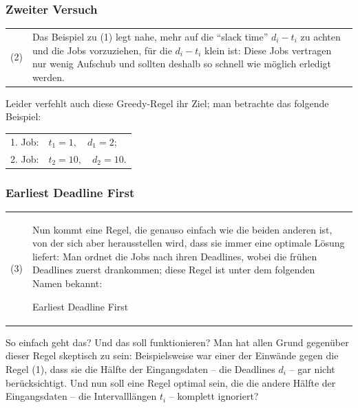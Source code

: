 \documentclass[smaller]{beamer}
\begin{document}
\begin{frame}
\frametitle{Zweiter Versuch}
\begin{tabular}{p{0.5cm}p{10cm}} 
(2) & Das Beispiel zu (1) legt nahe, mehr auf die \enquote{slack time} $d_i - t_i$ zu achten und \alert{die Jobs vorzuziehen, für die $d_i-t_i$ klein ist:} Diese Jobs vertragen nur wenig Aufschub und sollten deshalb so schnell wie möglich erledigt werden.
\end{tabular}
\medskip

Leider verfehlt auch diese Greedy-Regel ihr Ziel; man betrachte das folgende Beispiel:

\begin{center}
\begin{tabular}{rl}
1. Job: & $t_1=1, \quad d_1=2$; \\
2. Job: & $t_2=10, \quad d_2=10$.
\end{tabular}
\end{center}
\end{frame}

\begin{frame}
 \frametitle{Earliest Deadline First}
 \begin{tabular}{p{0.5cm}p{10cm}} 
(3) & Nun kommt eine Regel, die genauso einfach wie die beiden anderen ist, von der sich aber herausstellen wird, dass sie immer eine optimale Lösung liefert: \alert{Man ordnet die Jobs nach ihren Deadlines, wobei die frühen Deadlines zuerst drankommen;} diese Regel ist unter dem folgenden Namen bekannt:
\begin{center}
\alert{Earliest Deadline First}
\end{center}
\end{tabular}
\medskip

So einfach geht das? Und das soll funktionieren? \alert{Man hat allen Grund gegenüber dieser Regel skeptisch zu sein:} Beispielsweise war einer der Einwände gegen die Regel (1), dass sie die Hälfte der Eingangsdaten -- die Deadlines $d_i$ -- gar nicht berücksichtigt. \alert{Und nun soll eine Regel optimal sein, die die andere Hälfte der Eingangsdaten -- die Intervalllängen $t_i$ -- komplett ignoriert?}
\end{frame}
\end{document}
